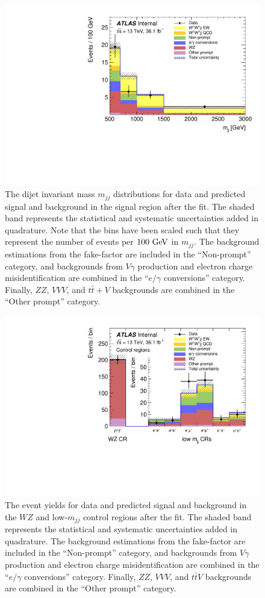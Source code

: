 \begin{figure}[htbp]
  \centering
  \includegraphics[width=.6\textwidth]{figs/ssww_13tev/results/mjj_postfit_all}
  \caption{The dijet invariant mass $m_{jj}$ distributions for data and predicted signal and background in the signal region after the fit.  The shaded band represents the statistical and systematic uncertainties added in quadrature.  Note that the bins have been scaled such that they represent the number of events per $100\gev$ in $m_{jj}$.  The background estimations from the fake-factor are included in the ``Non-prompt'' category, and backgrounds from  $V\gamma$ production and electron charge misidentification are combined in the ``$e/\gamma$ conversions'' category.  Finally, $ZZ$, $VVV$, and $t\bar{t}+V$ backgrounds are combined in the ``Other prompt'' category.}
  \label{fig:ssww13tev_results_mjj_sr_postfit}
\end{figure}

\begin{figure}[htbp]
  \centering
  \includegraphics[width=.6\textwidth]{figs/ssww_13tev/results/plotCR}
  \caption{The event yields for data and predicted signal and background in the $WZ$ and low-$m_{jj}$ control regions after the fit.  The shaded band represents the statistical and systematic uncertainties added in quadrature.  The background estimations from the fake-factor are included in the ``Non-prompt'' category, and backgrounds from  $V\gamma$ production and electron charge misidentification are combined in the ``$e/\gamma$ conversions'' category.  Finally, $ZZ$, $VVV$, and $t\bar{t}V$ backgrounds are combined in the ``Other prompt'' category.}
  \label{fig:ssww13tev_results_cr_postfit}
\end{figure}

